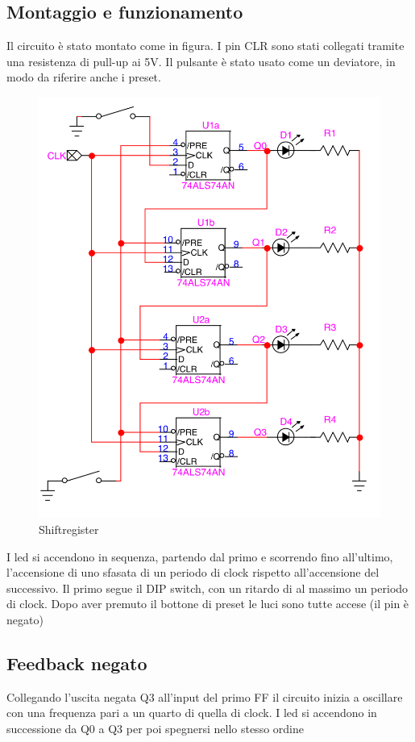 \documentclass[10pt,a4paper]{article}
\begin{document}
\subsection{Montaggio e funzionamento}
Il circuito è stato montato come in figura. I pin CLR sono stati collegati tramite una resistenza di pull-up ai 5V. Il pulsante è stato usato come un deviatore, in modo da riferire anche i preset.
\begin{figure}[h]
	\includegraphics[scale=1]{circuito3.png}
	\caption{Shiftregister}                                
\end{figure}
I led si accendono in sequenza, partendo dal primo e scorrendo fino all'ultimo, l'accensione di uno sfasata di un periodo di clock rispetto all'accensione del successivo. Il primo segue il DIP switch, con un ritardo di al massimo un periodo di clock. Dopo aver premuto il bottone di preset le luci sono tutte accese (il pin è negato)

\subsection{Feedback negato}
Collegando l'uscita negata Q3 all'input del primo FF il circuito inizia a oscillare con una frequenza pari a un quarto di quella di clock. I led si accendono in successione da Q0 a Q3 per poi spegnersi nello stesso ordine
\end{document}
